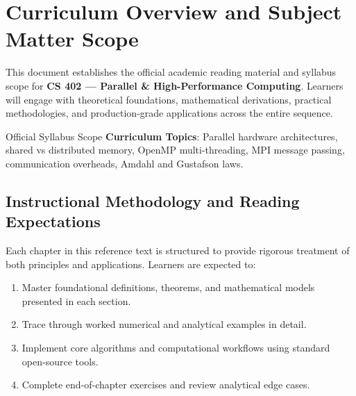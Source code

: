 \section{Curriculum Overview and Subject Matter Scope}

This document establishes the official academic reading material and syllabus scope for \textbf{CS 402 --- Parallel \& High-Performance Computing}. Learners will engage with theoretical foundations, mathematical derivations, practical methodologies, and production-grade applications across the entire sequence.

\begin{InsightBox}{Official Syllabus Scope}
  \textbf{Curriculum Topics}: Parallel hardware architectures, shared vs distributed memory, OpenMP multi-threading, MPI message passing, communication overheads, Amdahl and Gustafson laws.
\end{InsightBox}

\subsection{Instructional Methodology and Reading Expectations}

Each chapter in this reference text is structured to provide rigorous treatment of both principles and applications. Learners are expected to:
\begin{enumerate}
  \item Master foundational definitions, theorems, and mathematical models presented in each section.
  \item Trace through worked numerical and analytical examples in detail.
  \item Implement core algorithms and computational workflows using standard open-source tools.
  \item Complete end-of-chapter exercises and review analytical edge cases.
\end{enumerate}


